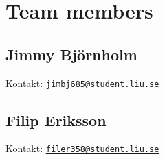 \hypertarget{index_creator_sec}{}\section{Team members}\label{index_creator_sec}
\hypertarget{index_jimmy}{}\subsection{Jimmy Björnholm}\label{index_jimmy}
Kontakt\+: \href{mailto:jimbj685@student.liu.se}{\tt jimbj685@student.\+liu.\+se} \hypertarget{index_filip}{}\subsection{Filip Eriksson}\label{index_filip}
Kontakt\+: \href{mailto:filer358@student.liu.se}{\tt filer358@student.\+liu.\+se} 